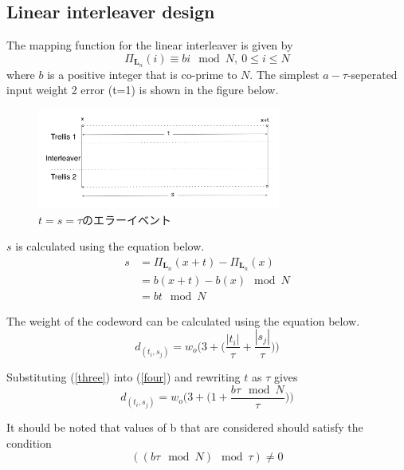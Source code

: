 \documentclass[20 pts]{article}
\begin{document}
\subsection{Linear interleaver design}
The mapping function for the linear interleaver is given by
\begin{equation}
\Pi_{\mathbf{L}_n}(i) \equiv bi  \mod N, \ 0 \leq i \leq N
\label{two}
\end{equation}
where $b$ is a positive integer that is co-prime to $N$. 
The simplest $a-\tau$-seperated input weight 2 error (t=1) is shown in the figure 
below.

\begin{center}
\begin{figure}[h!]
\includegraphics[width=8cm]{weight2.jpg}
\caption{$t=s=\tau$のエラーイベント}
\label{2_error}
\end{figure}
\end{center}

$s$ is calculated using the equation below.
\begin{equation}
\begin{split}
s&=\Pi_{\mathbf{L}_n}(x+t)-\Pi_{\mathbf{L}_n}(x)\\
&=b(x+t)-b(x) \mod N\\
&=bt \mod N
\label{three}
\end{split}
\end{equation}

The weight of the codeword can be calculated using the equation below.
\begin{equation}
d_{(t_i,s_j)}=w_o\Bigg( 3+\Bigg( \frac{ \left|t_i\right|}{\tau} + \frac{ \left|s_j\right|}{\tau} \Bigg)\Bigg)
\label{four}
\end{equation}

Substituting (\ref{three}) into (\ref{four}) and rewriting $t$ as $\tau$ gives
\begin{equation}
d_{(t_i,s_j)}=w_o\Bigg( 3+\Bigg( 1+ \frac{ b\tau \mod N}{\tau} \Bigg)\Bigg)
\label{five}
\end{equation}

It should be noted that values of b that are considered should satisfy the condition
\begin{equation}
( (b\tau \mod N )\mod \tau ) \neq 0
\label{six}
\end{equation}
\end{document}
